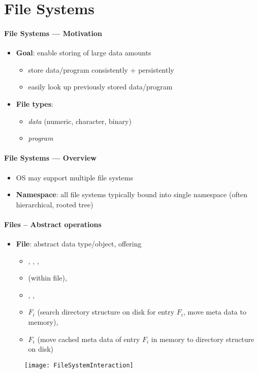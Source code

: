 \section{File Systems}

\paragraph{File Systems --- Motivation}
\begin{itemize}
  \item \textbf{Goal}: enable storing of large data amounts
  \begin{itemize}
    \item store data/program consistently + persistently
    \item easily look up previously stored data/program
  \end{itemize}
  \item \textbf{File types}:
  \begin{itemize}
    \item \emph{data} (numeric, character, binary)
    \item \emph{program}
  \end{itemize}
\end{itemize}

\paragraph{File Systems --- Overview}
\begin{itemize}
  \item OS may support multiple file systems
  \item \textbf{Namespace}: all file systems typically bound into single namespace (often hierarchical, rooted tree)
\end{itemize}

\paragraph{Files -- Abstract operations}
\begin{itemize}
  \item \textbf{File}: abstract data type/object, offering
  \begin{itemize}
    \item {}, , ,
    \item {} (within file),
    \item {}, ,
    \item {}$ F_i $\code{)} (search directory structure on disk for entry $ F_i $, move meta data to memory),
    \item {}$ F_i $\code{)} (move cached meta data of entry $ F_i $ in memory to directory structure on disk)
  \end{itemize}
\end{itemize}
\begin{figure}[h]\centering\label{FileSystemInteraction}\texttt{[image: FileSystemInteraction]}\end{figure}

